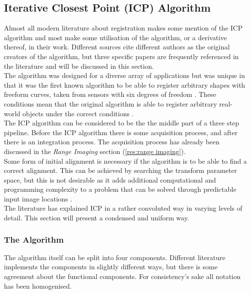 \subsection{Iterative Closest Point (ICP) Algorithm}
\label{res:icp}
Almost all modern literature about registration makes some mention of the ICP algorithm and most make some utilisation of the algorithm, or a derivative thereof, in their work. Different sources cite different authors as the original creators of the algorithm, but three specific papers are frequently referenced in the literature \cite{zhang94, besl92, chen92} and will be discussed in this section. \\

The algorithm was designed for a diverse array of applications but was unique in that it was the first known algorithm to be able to register arbitrary shapes with freeform curves, taken from sensors with six degrees of freedom \cite{zhang94, besl92}. These conditions mean that the original algorithm is able to register arbitrary real-world objects under the correct conditions \cite{stuart65}. \\

The ICP algorithm can be considered to be the the middle part of a three step pipeline. Before the ICP algorithm there is some acquisition process, and after there is an integration process. The acquisition process has already been discussed in the \emph{Range Imaging} section (\ref{res:range imaging}). \\

Some form of initial alignment is necessary if the algorithm is to be able to find a correct alignment. This can be achieved by searching the transform parameter space, but this is not desirable as it adds additional computational and programming complexity to a problem that can be solved through predictable input image locations \cite{chen92}. \\

The literature has explained ICP in a rather convoluted way in varying levels of detail. This section will present a condensed and uniform way. 

\subsubsection{The Algorithm}
The algorithm itself can be split into four components. Different literature implements the components in slightly different ways, but there is some agreement about the functional components. For consistency's sake all notation has been homogenised.  

